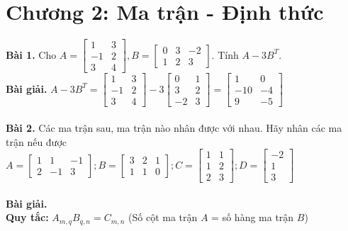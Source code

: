 \documentclass[12pt]{report}
\begin{document}
\section*{Chương 2: Ma trận - Định thức}

\textbf{Bài 1.} 
Cho $A = \begin{bmatrix}
	1 & 3 \\ -1 & 2 \\ 3 & 4
	\end{bmatrix}, B = \begin{bmatrix} 
	0 & 3 & -2 \\ 1 & 2 & 3 \end{bmatrix}$. 
Tính $A - 3B^T$.\\
\textbf{Bài giải.}
 $A - 3B^T = \begin{bmatrix}
	1 & 3 \\ -1 & 2 \\ 3 & 4 
	\end{bmatrix} - 3\begin{bmatrix} 
	0 & 1 \\ 3 & 2 \\ -2 & 3 
	\end{bmatrix} = \begin{bmatrix}
	1 & 0 \\ -10 & -4 \\ 9 & -5 
	\end{bmatrix}$\\ \\
\textbf{Bài 2.} Các ma trận sau, ma trận nào nhân được với nhau. Hãy nhân các ma trận nếu được\\ 
$A = \begin{bmatrix} 1 & 1 & - 1 \\ 2 & -1 & 3 \end{bmatrix}; 
	B = \begin{bmatrix} 3 & 2 & 1 \\ 1 & 1 & 0 \end{bmatrix};
	C = \begin{bmatrix} 1 & 1 \\ 1 & 2 \\ 2 & 3 \end{bmatrix};
	D = \begin{bmatrix} -2 \\ 1 \\ 3 \end{bmatrix}$\\ \\
\textbf{Bài giải.}\\
\textbf{Quy tắc:} $A_{m,q}B_{q,n}=C_{m,n}$ (Số cột ma trận $A$ = số hàng ma trận $B$)\\
\end{document}
